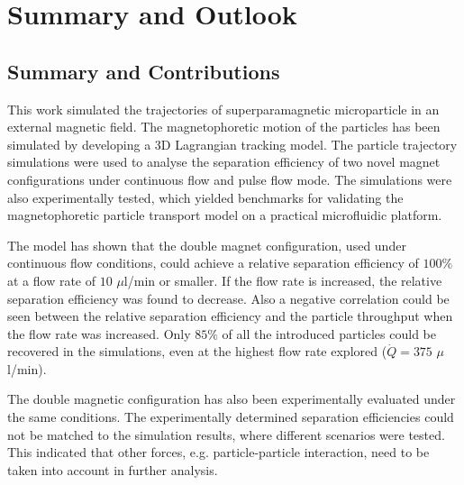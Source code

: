 \chapter{Summary and Outlook}\label{ch:summaryAndOutlook}
\section{Summary and Contributions}\label{s:SummaryAndContributions}

This work simulated the trajectories of superparamagnetic microparticle in an external magnetic field. The magnetophoretic motion of the particles has been simulated by developing a 3D Lagrangian tracking model. The particle trajectory simulations were used to analyse the separation efficiency of two novel magnet configurations under continuous flow and pulse flow mode. The simulations were also experimentally tested, which yielded benchmarks for validating the magnetophoretic particle transport model on a practical microfluidic platform.


The model has shown that the double magnet configuration, used under continuous flow conditions, could achieve a relative separation efficiency of $100\%$ at a flow rate of $10$ $\mu$l/min or smaller. If the flow rate is increased, the relative separation efficiency was found to decrease. Also a negative correlation could be seen between the relative separation efficiency and the particle throughput when the flow rate was increased. Only $85\%$ of all the introduced particles could be recovered in the simulations, even at the highest flow rate explored ($\dot{Q}=375$ $\mu$l/min). 

The double magnetic configuration has also been experimentally evaluated under the same conditions. The experimentally determined separation efficiencies could not be matched to the simulation results, where different scenarios were tested. This indicated that other forces, e.g. particle-particle interaction, need to be taken into account in further analysis. 

